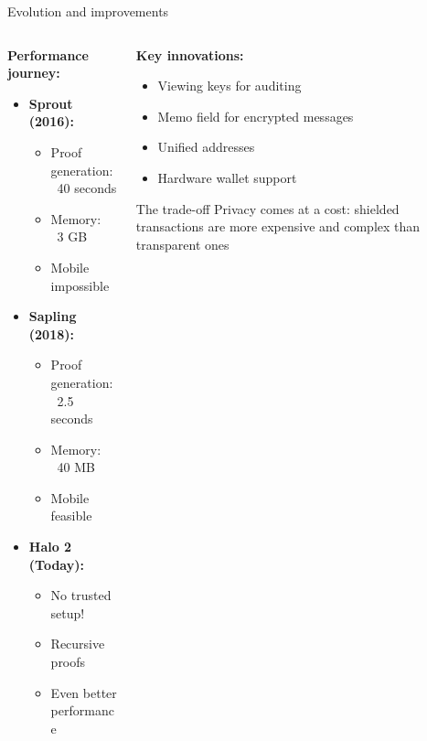 \documentclass[aspectratio=169, lualatex, handout]{beamer}
\begin{document}
\begin{frame}{Evolution and improvements}
	\begin{columns}[c]
		\begin{column}{0.5\textwidth}
			\textbf{Performance journey:}
			\begin{itemize}
				\item \textbf{Sprout (2016):}
				      \begin{itemize}
					      \item Proof generation: ~40 seconds
					      \item Memory: ~3 GB
					      \item Mobile impossible
				      \end{itemize}
				\item \textbf{Sapling (2018):}
				      \begin{itemize}
					      \item Proof generation: ~2.5 seconds
					      \item Memory: ~40 MB
					      \item Mobile feasible
				      \end{itemize}
				\item \textbf{Halo 2 (Today):}
				      \begin{itemize}
					      \item No trusted setup!
					      \item Recursive proofs
					      \item Even better performance
				      \end{itemize}
			\end{itemize}
		\end{column}
		\begin{column}{0.5\textwidth}
			\textbf{Key innovations:}
			\begin{itemize}
				\item Viewing keys for auditing
				\item Memo field for encrypted messages
				\item Unified addresses
				\item Hardware wallet support
			\end{itemize}
			\vspace{0.5em}
			\begin{alertblock}{The trade-off}
				Privacy comes at a cost: shielded transactions are more expensive and complex than transparent ones
			\end{alertblock}
		\end{column}
	\end{columns}
\end{frame}
\end{document}
